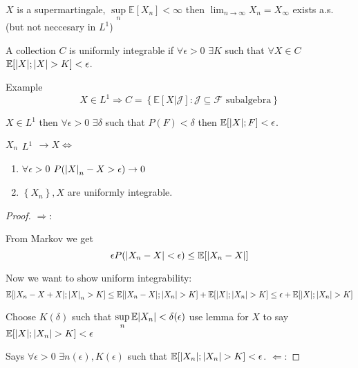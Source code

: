 \begin{theorem} \label{mart_conv}
	$X$ is a supermartingale, $\sup\limits_n \mathbb{E} [X_n] <\infty$ then $\lim_{n\to\infty} X_n = X_\infty$ exists a.s. (but not neccesary in $L^1$)
\end{theorem}
\begin{definition}
	A collection $C$ is uniformly integrable if $\forall \epsilon>0$ $\exists K$ such that $\forall X\in C$ $\mathbb{E} [\abs{X} ; \abs{X}>K] <\epsilon$.
\end{definition}

Example
$$X \in L^1 \Rightarrow C = \left\{ \mathbb{E} [X|\mathcal{J}] : \mathcal{J}\subseteq \mathcal{F} \text{ subalgebra} \right\}$$
\begin{lemma}
	$X\in L^1$ then $\forall \epsilon > 0$ $\exists \delta$ such that $P(F)<\delta$ then $\mathbb{E} \qty[\abs{X} ; F] < \epsilon$. 

\end{lemma}

\begin{theorem}
	$X_n \substack{L^1}{\to} X \iff$
	\begin{enumerate}
		\item $\forall \epsilon>0$ $P(\abs{X}_n-X >\epsilon) \to 0$
		\item $\left\{  X_n \right\}, X$ are uniformly integrable.
	\end{enumerate}

\begin{proof}
	
	$\Rightarrow$:
	
	From Markov we get
	$$\epsilon P(\abs{X_n-X}<\epsilon) \leq \mathbb{E} \qty[\abs{X_n-X}]$$

	Now we want to show uniform integrability:
	$$\mathbb{E} \qty[\abs{X_n -X+X }; \abs{X}_n> K] \leq \mathbb{E} \qty[\abs{X_n -X}; \abs{X_n}>K]   +\mathbb{E} \qty[\abs{X}; \abs{X_n}> K]  \leq \epsilon +  \mathbb{E} \qty[\abs{X}; \abs{X_n}> K] $$
	
	Choose $K(\delta)$ such that $\sup\limits_n \mathbb{E} \abs{X_n} < \delta(\epsilon)$ use lemma for $X$ to say $\mathbb{E} \qty[\abs{X} ; \abs{X_n}>K]<\epsilon$
	
	Says $\forall \epsilon>0$ $\exists n(\epsilon), K(\epsilon) $ such that $\mathbb{E} \qty[\abs{X_n} ; \abs{X_n}>K] <\epsilon$.
	$\Leftarrow$:
\end{proof}
\end{theorem}

